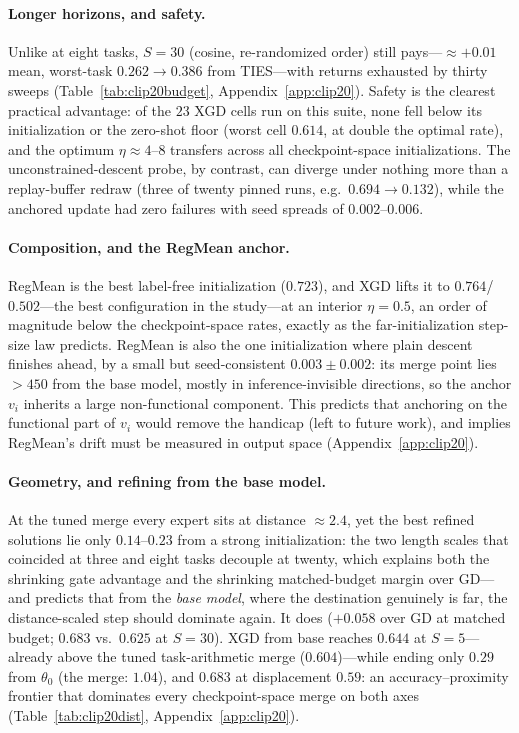 \documentclass{article} %
\begin{document}
\paragraph{Longer horizons, and safety.}
Unlike at eight tasks, $S=30$ (cosine, re-randomized order) still pays---${\approx}{+}0.01$ mean, worst-task $0.262\to0.386$ from TIES---with returns exhausted by thirty sweeps (Table~\ref{tab:clip20budget}, Appendix~\ref{app:clip20}). Safety is the clearest practical advantage: of the $23$ XGD cells run on this suite, none fell below its initialization or the zero-shot floor (worst cell $0.614$, at double the optimal rate), and the optimum $\eta\approx4$--$8$ transfers across all checkpoint-space initializations. The unconstrained-descent probe, by contrast, can diverge under nothing more than a replay-buffer redraw (three of twenty pinned runs, e.g.\ $0.694\to0.132$), while the anchored update had zero failures with seed spreads of $0.002$--$0.006$.

\paragraph{Composition, and the RegMean anchor.}
RegMean is the best label-free initialization ($0.723$), and XGD lifts it to $0.764$/$0.502$---the best configuration in the study---at an interior $\eta=0.5$, an order of magnitude below the checkpoint-space rates, exactly as the far-initialization step-size law predicts. RegMean is also the one initialization where plain descent finishes ahead, by a small but seed-consistent $0.003\pm0.002$: its merge point lies $>450$ from the base model, mostly in inference-invisible directions, so the anchor $v_i$ inherits a large non-functional component. This predicts that anchoring on the functional part of $v_i$ would remove the handicap (left to future work), and implies RegMean's drift must be measured in output space (Appendix~\ref{app:clip20}).

\paragraph{Geometry, and refining from the base model.}
At the tuned merge every expert sits at distance ${\approx}2.4$, yet the best refined solutions lie only $0.14$--$0.23$ from a strong initialization: the two length scales that coincided at three and eight tasks decouple at twenty, which explains both the shrinking gate advantage and the shrinking matched-budget margin over GD---and predicts that from the \emph{base model}, where the destination genuinely is far, the distance-scaled step should dominate again. It does ($+0.058$ over GD at matched budget; $0.683$ vs.\ $0.625$ at $S=30$). XGD from base reaches $0.644$ at $S=5$---already above the tuned task-arithmetic merge ($0.604$)---while ending only $0.29$ from $\theta_0$ (the merge: $1.04$), and $0.683$ at displacement $0.59$: an accuracy--proximity frontier that dominates every checkpoint-space merge on both axes (Table~\ref{tab:clip20dist}, Appendix~\ref{app:clip20}).
\fi
\end{document}
